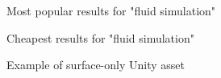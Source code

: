 \documentclass[12pt]{article}
\newcommand{\wideimage}[2][]{%
  \makebox[\textwidth][c]{\texttt{[image: \#2]}}%
}
\begin{document}
    \begin{figure}[H]
        \noindent\wideimage[]{unityStore1.png}
        \caption{Most popular results for "fluid simulation" \cite{unityasset}}
    \end{figure}

    \begin{figure}[H]
        \noindent\wideimage[]{unityStore2.png}
        \caption{Cheapest results for "fluid simulation" \cite{unityasset}}
    \end{figure}

    \begin{figure}[H]
        \noindent\wideimage[]{stylizedWaterURP.png}
        \caption{Example of surface-only Unity asset \cite{stylized}}
    \end{figure}
\end{document}
